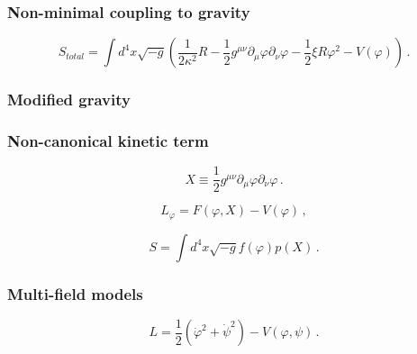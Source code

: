 \subsubsection{Non-minimal coupling to gravity}
\label{subsubsection:2.4.2.1}

\begin{equation}
S_{total} = \int d^4 x \sqrt{-g} \left( \frac{1}{2 \kappa^2} R -\frac{1}{2}g^{\mu \nu} \partial_{\mu} \varphi \partial_{\nu} \varphi -\frac{1}{2}\xi R \varphi^2 - V(\varphi) \right) \, .
\label{equation:2.4.7}
\end{equation} 

\subsubsection{Modified gravity}
\label{subsubsection:2.4.2.2}

\subsubsection{Non-canonical kinetic term}
\label{subsubsection:2.4.2.3}    


\begin{equation}
X \equiv \frac{1}{2}g^{\mu\nu}\partial_{\mu}\varphi \partial_{\nu}\varphi \, .
\label{equation:2.4.8}
\end{equation}

\begin{equation}
L_{\varphi} = F(\varphi , X) - V(\varphi) \, ,
\label{equation:2.4.9}
\end{equation}

\begin{equation}
S = \int d^4 x \sqrt{-g} f(\varphi) p(X) \, .
\label{equation:2.4.10}
\end{equation}

\subsubsection{Multi-field models}
\label{subsubsection:2.4.2.4}

\begin{equation}
L = \frac{1}{2} \left( \dot{\varphi}^2 + \dot{\psi}^2 \right) - V(\varphi,\psi) \, .
\label{equation:2.4.11}
\end{equation}

